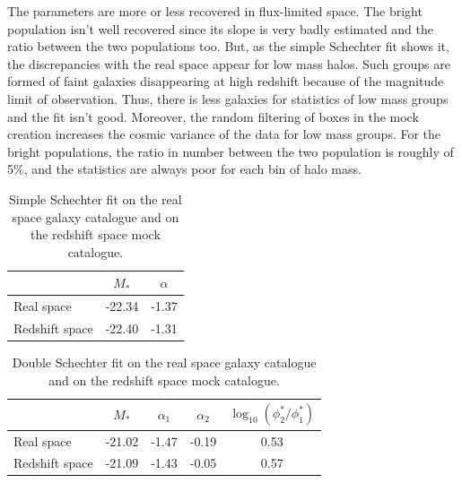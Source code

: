 The parameters are more or less recovered in flux-limited space. The bright
population isn't well recovered since its slope is very badly estimated and the
ratio between the two populations too. But, as the simple Schechter fit shows
it, the discrepancies with the real space appear for low mass halos. Such
groups are formed of faint galaxies disappearing at high redshift because of
the magnitude limit of observation. Thus, there is less galaxies for statistics
of low mass groups and the fit isn't good. Moreover, the random filtering of
boxes in the mock creation increases the cosmic variance of the data for low
mass groups. For the bright populations, the ratio in number between the two
population is roughly of 5\%, and the statistics are always poor for each bin
of halo mass.
%
\begin{table}
    \centering
    \caption{Simple Schechter fit on the real space galaxy catalogue and on the
    redshift space mock catalogue.}
    \begin{tabular}{lcc}
        \toprule
        & $M_*$ & $\alpha$ \\
        \toprule
        Real space & -22.34 & -1.37 \\
        \midrule
        Redshift space & -22.40 & -1.31 \\
        \bottomrule
    \end{tabular}
\end{table}
%
\begin{table}
    \centering
    \caption{Double Schechter fit on the real space galaxy catalogue and on the
    redshift space mock catalogue.}
    \begin{tabular}{lcccc}
        \toprule
        & $M_*$ & $\alpha_1$ & $\alpha_2$ &
        $\log_{10}\left(\phi_2^*/\phi_1^*\right)$ \\
        \toprule
        Real space & -21.02 & -1.47 & -0.19 & 0.53 \\
        \midrule
        Redshift space & -21.09 & -1.43 & -0.05 & 0.57 \\
        \bottomrule
    \end{tabular}
\end{table}

